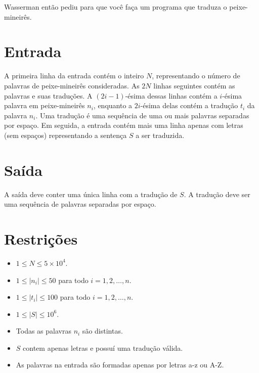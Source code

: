 Wasserman então pediu para que você faça um programa que traduza o peixe-mineirês.

\section*{Entrada}

A primeira linha da entrada contém o inteiro $N$, representando o número de palavras de peixe-mineirês consideradas.
As $2N$ linhas seguintes contém as palavras e suas traduções. A $(2i - 1)$-ésima dessas linhas contém a $i$-ésima palavra em peixe-mineirês $n_i$, enquanto a $2i$-ésima delas contém a tradução $t_i$ da palavra $n_i$. Uma tradução é uma sequência de uma ou mais palavras separadas por espaço. Em seguida, a entrada contém mais uma linha apenas com letras (sem espaços) representando a sentença $S$ a ser traduzida.

\section*{Saída}

A saída deve conter uma única linha com a tradução de $S$. A tradução deve ser uma sequência de palavras separadas por espaço.

\section*{Restrições}

\begin{itemize}
\item $1 \le N \le 5 \times 10^4$.
\item $1 \le |n_i| \le 50$ para todo $i = 1, 2, \ldots, n$.
\item $1 \le |t_i| \le 100$ para todo $i = 1, 2, \ldots, n$.
\item $1 \le |S| \le 10^6$.
\item Todas as palavras $n_i$ são distintas.
\item $S$ contem apenas letras e possuí uma tradução válida.
\item As palavras na entrada são formadas apenas por letras a-z ou A-Z.
\end{itemize}

\exemplo
